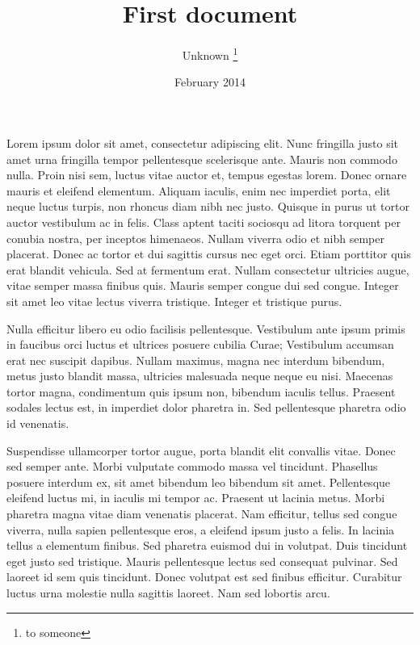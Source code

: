 \documentclass[12pt, letterpaper,twocolumn]{article}
\title{First document}
\author{Unknown \thanks{to someone}}
\date{February 2014}
\begin{document}
 
\begin{titlepage}
\maketitle
\end{titlepage}

\onecolumn

\twocolumn
Lorem ipsum dolor sit amet, consectetur adipiscing elit. Nunc fringilla justo sit amet urna fringilla tempor pellentesque scelerisque ante. Mauris non commodo nulla. Proin nisi sem, luctus vitae auctor et, tempus egestas lorem. Donec ornare mauris et eleifend elementum. Aliquam iaculis, enim nec imperdiet porta, elit neque luctus turpis, non rhoncus diam nibh nec justo. Quisque in purus ut tortor auctor vestibulum ac in felis. Class aptent taciti sociosqu ad litora torquent per conubia nostra, per inceptos himenaeos. Nullam viverra odio et nibh semper placerat. Donec ac tortor et dui sagittis cursus nec eget orci. Etiam porttitor quis erat blandit vehicula. Sed at fermentum erat. Nullam consectetur ultricies augue, vitae semper massa finibus quis. Mauris semper congue dui sed congue. Integer sit amet leo vitae lectus viverra tristique. Integer et tristique purus.

Nulla efficitur libero eu odio facilisis pellentesque. Vestibulum ante ipsum primis in faucibus orci luctus et ultrices posuere cubilia Curae; Vestibulum accumsan erat nec suscipit dapibus. Nullam maximus, magna nec interdum bibendum, metus justo blandit massa, ultricies malesuada neque neque eu nisi. Maecenas tortor magna, condimentum quis ipsum non, bibendum iaculis tellus. Praesent sodales lectus est, in imperdiet dolor pharetra in. Sed pellentesque pharetra odio id venenatis.

Suspendisse ullamcorper tortor augue, porta blandit elit convallis vitae. Donec sed semper ante. Morbi vulputate commodo massa vel tincidunt. Phasellus posuere interdum ex, sit amet bibendum leo bibendum sit amet. Pellentesque eleifend luctus mi, in iaculis mi tempor ac. Praesent ut lacinia metus. Morbi pharetra magna vitae diam venenatis placerat. Nam efficitur, tellus sed congue viverra, nulla sapien pellentesque eros, a eleifend ipsum justo a felis. In lacinia tellus a elementum finibus. Sed pharetra euismod dui in volutpat. Duis tincidunt eget justo sed tristique. Mauris pellentesque lectus sed consequat pulvinar. Sed laoreet id sem quis tincidunt. Donec volutpat est sed finibus efficitur. Curabitur luctus urna molestie nulla sagittis laoreet. Nam sed lobortis arcu.
\end{document}
